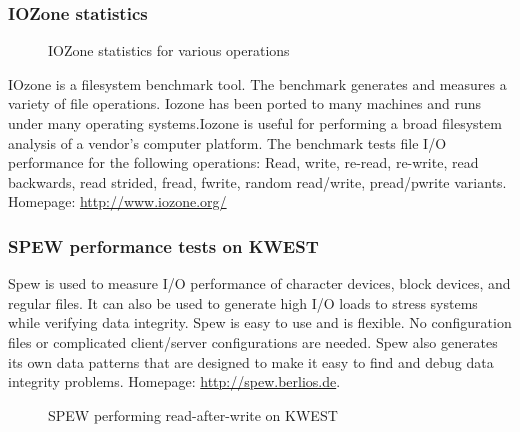 \subsubsection{IOZone statistics}
\begin{figure}[htb]
\centering
\setlength\fboxsep{0pt}
\setlength\fboxrule{0.5pt}
\caption{IOZone statistics for various operations}
\label{fig:dfd0}
\end{figure}
IOzone is a filesystem benchmark tool. The benchmark generates and measures a variety of file operations. Iozone has been ported to many machines and runs under many operating systems.Iozone is useful for performing a broad filesystem analysis of a vendor’s computer platform. The benchmark tests file I/O performance for the following operations: Read, write, re-read, re-write, read backwards, read strided, fread, fwrite, random read/write, pread/pwrite variants. Homepage: \url{http://www.iozone.org/}

\subsubsection{SPEW performance tests on KWEST}
Spew is used to measure I/O performance of character devices, block devices, and regular files. It can also be used to generate high I/O loads to stress systems while verifying data integrity. Spew is easy to use and is flexible. No configuration files or complicated client/server configurations are needed. Spew also generates its own data patterns that are designed to make it easy to find and debug data integrity problems. Homepage: \url{http://spew.berlios.de}.
\begin{figure}[htb]
\centering
\setlength\fboxsep{0pt}
\setlength\fboxrule{0.5pt}
\caption{SPEW performing read-after-write on KWEST}
\label{fig:dfd0}
\end{figure}

